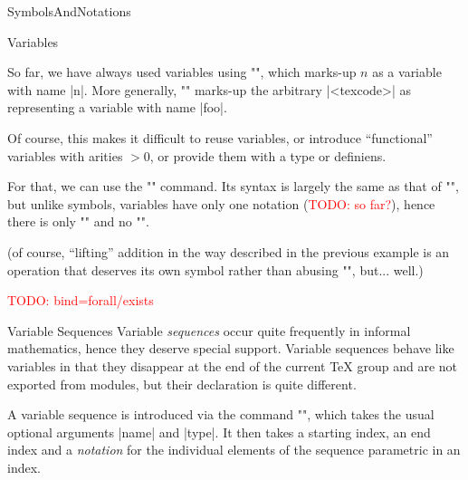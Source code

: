 \begin{smodule}[ns=https://github.com/slatex/sTeX/doc]{SymbolsAndNotations}
\begin{sfragment}{Variables}
    \begin{function}{\svar}
        So far, we have always used variables using \stexcode"",
        which marks-up $n$ as a variable with name |n|. More
        generally, \stexcode""
        marks-up the arbitrary |<texcode>| as representing a
        variable with name |foo|.
    \end{function}

    Of course, this makes it difficult to reuse variables,
    or introduce ``functional'' variables with arities $>0$,
    or provide them with a type or definiens.

    \begin{function}{\vardef}
        For that, we can use the \stexcode"\vardef" command. Its
        syntax is largely the same as that of \stexcode"\symdef",
        but unlike symbols, variables have only one notation 
        (\textcolor{red}{TODO: so far?}), hence there
        is only \stexcode"\vardef" and no \stexcode"\vardecl".
    \end{function}
    (of course, ``lifting'' addition in the way described
    in the previous example is an operation that deserves its
    own symbol rather than abusing \stexcode"\addition",
    but... well.)

    \textcolor{red}{TODO: bind=forall/exists}
\end{sfragment}

\begin{sfragment}{Variable Sequences}
    Variable \emph{sequences} occur quite frequently in informal
    mathematics, hence they deserve special support. Variable sequences
    behave like variables in that they disappear at the end of the
    current \TeX\xspace group and are not exported from modules,
    but their declaration is quite different.

    \begin{function}{\varseq}
        A variable sequence is introduced via the command
        \stexcode"\varseq", which takes the usual optional arguments
        |name| and |type|. It then takes a starting index,
        an end index and a \emph{notation} for the individual
        elements of the sequence parametric in an index.
    \end{function}


\end{sfragment}
\end{smodule}
